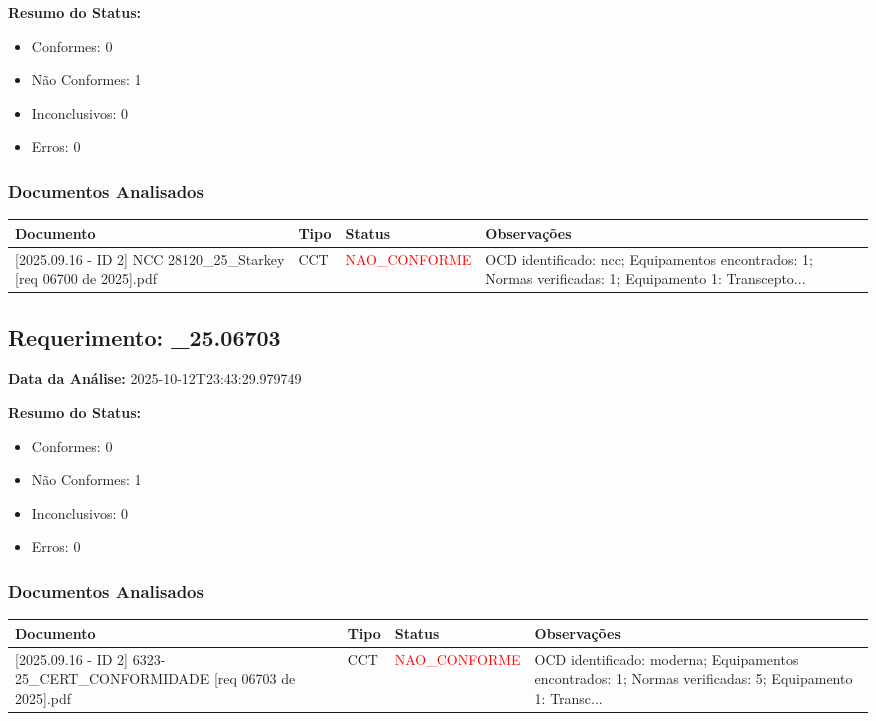 \documentclass[12pt,a4paper]{article}
\begin{document}
\textbf{Resumo do Status:}
\begin{itemize}
    \item Conformes: 0
    \item Não Conformes: 1
    \item Inconclusivos: 0
    \item Erros: 0
\end{itemize}

\subsubsection{Documentos Analisados}

\begin{longtable}{|p{4cm}|p{2cm}|p{2cm}|p{6cm}|}
\hline
\textbf{Documento} & \textbf{Tipo} & \textbf{Status} & \textbf{Observações} \\
\hline
\endhead
[Certificado de Conformidade Técnica - CCT][2025.09.16 - ID 2] NCC 28120\_25\_Starkey [req 06700 de  2025].pdf & CCT & \textcolor{red}{NAO\_CONFORME} & OCD identificado: ncc; Equipamentos encontrados: 1; Normas verificadas: 1; Equipamento 1: Transcepto... \\
\hline
\end{longtable}


\subsection{Requerimento: \_25.06703}

\textbf{Data da Análise:} 2025-10-12T23:43:29.979749

\textbf{Resumo do Status:}
\begin{itemize}
    \item Conformes: 0
    \item Não Conformes: 1
    \item Inconclusivos: 0
    \item Erros: 0
\end{itemize}

\subsubsection{Documentos Analisados}

\begin{longtable}{|p{4cm}|p{2cm}|p{2cm}|p{6cm}|}
\hline
\textbf{Documento} & \textbf{Tipo} & \textbf{Status} & \textbf{Observações} \\
\hline
\endhead
[Certificado de Conformidade Técnica - CCT][2025.09.16 - ID 2] 6323-25\_CERT\_CONFORMIDADE [req 06703 de  2025].pdf & CCT & \textcolor{red}{NAO\_CONFORME} & OCD identificado: moderna; Equipamentos encontrados: 1; Normas verificadas: 5; Equipamento 1: Transc... \\
\hline
\end{longtable}
\end{document}
